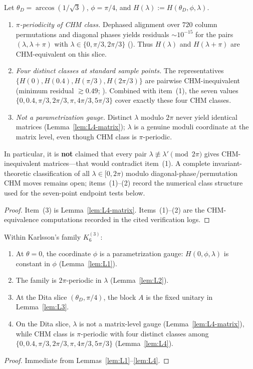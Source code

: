 \begin{lemma}
\label{lem:L4}
\label{lem:dita-chm-pi}
Let $\theta_D=\arccos(1/\sqrt3)$, $\phi=\pi/4$, and $H(\lambda):=H(\theta_D,\phi,\lambda)$.
\begin{enumerate}
    \item \emph{$\pi$-periodicity of CHM class.} Dephased alignment over $720$ column permutations and diagonal phases yields residuals $\sim10^{-15}$ for the pairs $(\lambda,\lambda+\pi)$ with $\lambda\in\{0,\pi/3,2\pi/3\}$ ().
    Thus $H(\lambda)$ and $H(\lambda+\pi)$ are CHM-equivalent on this slice.
    \item \emph{Four distinct classes at standard sample points.} The representatives $\{H(0),H(0.4),H(\pi/3),H(2\pi/3)\}$ are pairwise CHM-inequivalent (minimum residual $\gtrsim0.49$; ).
    Combined with item~(1), the seven values $\{0,0.4,\pi/3,2\pi/3,\pi,4\pi/3,5\pi/3\}$ cover exactly these four CHM classes.
    \item \emph{Not a parametrization gauge.} Distinct $\lambda$ modulo $2\pi$ never yield identical matrices (Lemma~\ref{lem:L4-matrix}); $\lambda$ is a genuine moduli coordinate at the matrix level, even though CHM class is $\pi$-periodic.
\end{enumerate}
In particular, it is \textbf{not} claimed that every pair $\lambda\not\equiv\lambda'\pmod{2\pi}$ gives CHM-inequivalent matrices---that would contradict item~(1).
A complete invariant-theoretic classification of all $\lambda\in[0,2\pi)$ modulo diagonal-phase/permutation CHM moves remains open; items~(1)--(2) record the numerical class structure used for the seven-point endpoint tests below.
\end{lemma}

\begin{proof}
Item~(3) is Lemma~\ref{lem:L4-matrix}.
Items~(1)--(2) are the CHM-equivalence computations recorded in the cited verification logs.
\end{proof}

\begin{theorem}
\label{thm:T1}
Within Karlsson's family $K_6^{(3)}$:
\begin{enumerate}
    \item At $\theta=0$, the coordinate $\phi$ is a parametrization gauge: $H(0,\phi,\lambda)$ is constant in $\phi$ (Lemma~\ref{lem:L1}).
    \item The family is $2\pi$-periodic in $\lambda$ (Lemma~\ref{lem:L2}).
    \item At the Dita slice $(\theta_D,\pi/4)$, the block $A$ is the fixed unitary in Lemma~\ref{lem:L3}.
    \item On the Dita slice, $\lambda$ is not a matrix-level gauge (Lemma~\ref{lem:L4-matrix}), while CHM class is $\pi$-periodic with four distinct classes among $\{0,0.4,\pi/3,2\pi/3,\pi,4\pi/3,5\pi/3\}$ (Lemma~\ref{lem:L4}).
\end{enumerate}
\end{theorem}

\begin{proof}
Immediate from Lemmas~\ref{lem:L1}--\ref{lem:L4}.
\end{proof}
